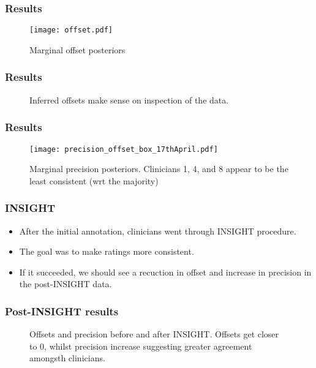 \begin{frame}
	\frametitle{Results}
	\begin{figure}[tbh]
		\centering\texttt{[image: offset.pdf]}
		\centering\caption{\label{fig:offset}Marginal offset posteriors}
	\end{figure}
\end{frame}

\begin{frame}
	\frametitle{Results}
	\begin{figure}[tbh]
		\centering\caption{\label{fig:actualratings}Inferred offsets make sense on inspection of the data.}
	\end{figure}
\end{frame}

\begin{frame}
	\frametitle{Results}
	\begin{figure}[tbh]
		\centering\texttt{[image: precision\_offset\_box\_17thApril.pdf]}
		\centering\caption{\label{fig:clinicalprecision}Marginal precision posteriors. Clinicians 1, 4, and 8 appear to be the least consistent (wrt the majority)}
	\end{figure}
\end{frame}

\begin{frame}
	\frametitle{INSIGHT}
	\begin{itemize}
		\item After the initial annotation, clinicians went through INSIGHT procedure.
		\item The goal was to make ratings more consistent.
		\item If it succeeded, we should see a recuction in offset and increase in precision in the post-INSIGHT data.
	\end{itemize}
\end{frame}

\begin{frame}
	\frametitle{Post-INSIGHT results}
	\begin{figure}[tbh]
		\hfill
		\centering\caption{\label{fig:clinoffprec}Offsets and precision before and after INSIGHT. Offsets get closer to 0, whilst precision increase suggesting greater agreement amongsth clinicians.}
	\end{figure}
\end{frame}

